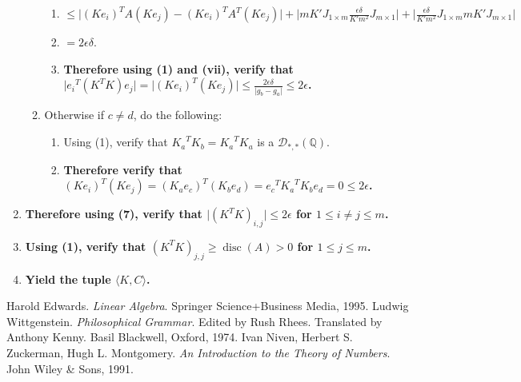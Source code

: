 \documentclass[twocolumn]{article}
\DeclareMathOperator{\disc}{disc}
\begin{document}
\begin{enumerate}
\begin{enumerate}
\begin{enumerate}
							\item $\le\lvert(Ke_i)^TA(Ke_j)-(Ke_i)^TA^T(Ke_j)\rvert+\lvert mK'J_{1\times m}\frac{\epsilon\delta}{K'm^2}J_{m\times 1}\rvert+\lvert\frac{\epsilon\delta}{K'm^2}J_{1\times m}mK'J_{m\times 1}\rvert$
							\item $=2\epsilon\delta$.
							\item \textbf{Therefore using (1) and (vii), verify that $\lvert {e_i}^T(K^TK)e_j\rvert=\lvert(Ke_i)^T(Ke_j)\rvert\le\frac{2\epsilon\delta}{\lvert g_b-g_a\rvert}\le 2\epsilon$.}
						\end{enumerate}
						\item Otherwise if $c\ne d$, do the following:
						\begin{enumerate}
							\item Using (1), verify that ${K_a}^TK_b={K_a}^TK_a$ is a $\mathcal{D}_{*,*}(\mathbb{Q})$.
							\item \textbf{Therefore verify that $(Ke_i)^T(Ke_j)=(K_ae_c)^T(K_be_d)={e_c}^T{K_a}^TK_be_d=0\le 2\epsilon$.}
						\end{enumerate}
					\end{enumerate}
					\item \textbf{Therefore using (7), verify that $\lvert(K^TK)_{i,j}\rvert\le 2\epsilon$ for $1\le i\ne j\le m$.}
					\item \textbf{Using (1), verify that $(K^TK)_{j,j}\ge\disc(A)>0$ for $1\le j\le m$.}
					\item \textbf{Yield the tuple $\langle K,C\rangle$.}
				\end{enumerate}
	\begin{thebibliography}{9}
			Harold Edwards.
			\textit{Linear Algebra}. 
			Springer Science+Business Media, 1995.
			Ludwig Wittgenstein.
			\textit{Philosophical Grammar}.
			Edited by Rush Rhees.
			Translated by Anthony Kenny.
			Basil Blackwell, Oxford, 1974.
			Ivan Niven, Herbert S. Zuckerman, Hugh L. Montgomery.
			\textit{An Introduction to the Theory of Numbers}.
			John Wiley \& Sons, 1991.
	\end{thebibliography}
\end{document}
